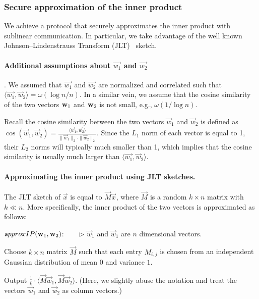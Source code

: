 \subsubsection{Secure approximation of the inner product}
\label{sec:jlt}
We achieve a protocol that securely approximates the inner product with
sublinear communication. In particular, we take advantage of the well
known Johnson–Lindenstrauss Transform (JLT)~\cite{JL84,STOC:IndMot98}
sketch. 


\paragraph{Additional assumptions about $\vec{w_1}$ and $\vec{w_2}$}. 
We assumed that $\vec{w_1}$ and $\vec{w_2}$ are normalized and correlated such
that $\langle \vec{{w}_1},
{\vec{w}_2} \rangle = \omega(\log n/n)$. In a similar vein, we assume that the
cosine similarity of the two vectors $\w_1$ and $\w_2$ is not small,
e.g., $\omega(1/\log n)$. 

Recall the cosine similarity between the two vectors $\vec{w}_1$ and
$\vec{w}_2$ is defined as %
$\cos(\vec{w}_1, \vec{w}_2) = \frac{\langle \vec{w}_1, \vec{w}_2 \rangle}{ \|
\vec{w}_1 \|_2 \cdot \| \vec{w}_2 \|_2}$.
% 
Since the $L_1$ norm of each vector is equal to 1, their $L_2$ norms
will typically much smaller than 1, which implies that the cosine
similarity is usually much larger than $\langle \vec{{w}_1},
{\vec{w}_2} \rangle$. 


\paragraph{Approximating the inner product using JLT sketches.}
The JLT sketch of $\vec{x}$ is equal to $\vec{M} \vec{x}$, where $\vec{M}$ is a
random $k \times n$ matrix with $k \ll n$. More specifically, the inner product
of the two vectors is approximated as follows:

\BEN
\item[] \hspace{-2em} ${\sf approxIP}(\vec{w}_1, \vec{w}_2)$: 
	~~~ $\rhd$ $\vec{w}_1$ and $\vec{w}_1$ are $n$ dimensional vectors. 
\item Choose $k \times n$ matrix $\vec{M}$ such that each entry $M_{i,j}$ is chosen from an
independent Gaussian distribution of mean $0$ and variance $1$.

\item Output $\frac 1 k \cdot \langle \vec{M}\vec{w}_1, \vec{M}\vec{w}_2 \rangle$. (Here, we
slightly abuse the notation and treat the vectors $\vec{w}_1$ and $\vec{w}_2$ as column vectors.)
\EEN

